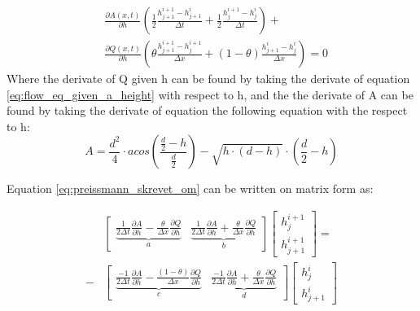 \begin{equation}\label{eq:preissmann_skrevet_om}
\begin{aligned}
	&\frac{\partial A(x,t)}{\partial h} \left(\frac{1}{2}\frac{h_{j+1}^{i+1}-h_{j+1}^i}{\Delta t} +  \frac{1}{2} \frac{h_{j}^{i+1} - h_j^i}{\Delta t}\right) + \\ &\frac{\partial Q(x,t)}{\partial h}\left(\theta \frac{h_{j+1}^{i+1}-h_j^{i+1}}{\Delta x}+(1-\theta)\frac{h_{j+1}^i - h_j^i}{\Delta x}\right)=0
\end{aligned}
\end{equation}
Where the derivate of Q given h can be found by taking the derivate of equation \ref{eq:flow_eq_given_a_height} with respect to h, and the the derivate of A can be found by taking the derivate of equation the following equation with the respect to h:
\begin{equation}%
	A = \frac {d^2}{4} \cdot acos \left(\frac{\frac{d}{2}-h}{\frac{d}{2}}\right)-\sqrt{h\cdot (d-h)}\cdot  \left(\frac{d}{2}-h\right)
\end{equation}

Equation \ref{eq:preissmann_skrevet_om} can be written on matrix form as:

\begin{equation}\label{eq:rearrange_continuity_eq}
\begin{aligned}
	&\begin{bmatrix}
		\underbrace{\frac{1}{2\Delta t}\frac{\partial A}{\partial h}-\frac{\theta}{\Delta x}\frac{\partial Q}{\partial h}}_{a} & \underbrace{\frac{1}{2\Delta t}\frac{\partial A}{\partial h}+\frac{\theta}{\Delta x}\frac{\partial Q}{\partial h}}_{b} 
	\end{bmatrix}
	\begin{bmatrix}
		h_{j}^{i+1} \\
		h_{j+1}^{i+1}
	\end{bmatrix}
	= \\ -
	&\begin{bmatrix}
		\underbrace{\frac{-1}{2\Delta t}\frac{\partial A}{\partial h}-\frac{(1-\theta)}{\Delta x}\frac{\partial Q}{\partial h}}_{c} & \underbrace{\frac{-1}{2\Delta t}\frac{\partial A}{\partial h}+\frac{\theta}{\Delta x}\frac{\partial Q}{\partial h}}_{d} 
	\end{bmatrix}
	\begin{bmatrix}
		h_{j}^{i} \\
		h_{j+1}^{i}
	\end{bmatrix}
	\end{aligned}
\end{equation}

